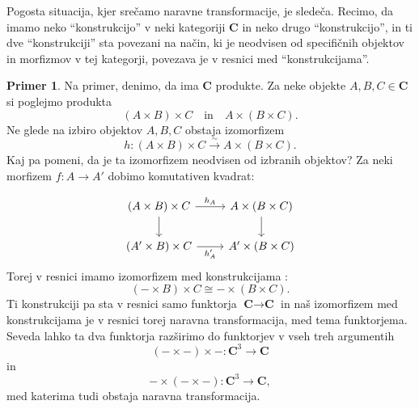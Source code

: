 \documentclass[12pt,a4paper]{book}
\theoremstyle{definition}
\theoremstyle{plain}
\theoremstyle{definition}
\newtheorem{primer}{Primer}[section]
\theoremstyle{remark}
\newcommand{\cat}[1]{\textbf{#1}}
\begin{document}
Pogosta situacija, kjer srečamo naravne transformacije, je sledeča. Recimo, da imamo neko "`konstrukcijo"' v neki kategoriji $\cat{C}$ in neko drugo "`konstrukcijo"', in ti dve "`konstrukciji"' sta povezani na način, ki je neodvisen od specifičnih objektov in morfizmov v tej kategorji, povezava je v resnici med "`konstrukcijama"'. 
\begin{primer}
Na primer, denimo, da ima $\cat{C}$ produkte. Za neke objekte $A,B,C \in \cat{C}$ si poglejmo produkta
$$(A \times B) \times C \quad \text{in} \quad A \times (B \times C).$$
Ne glede na izbiro objektov $A,B,C$ obstaja izomorfizem
$$h : (A \times B) \times C \xrightarrow{\sim} A \times (B \times C).$$
Kaj pa pomeni, da je ta izomorfizem neodvisen od izbranih objektov? Za neki morfizem $f : A \to A'$ dobimo komutativen kvadrat:

$$ \begin{tikzcd}
(A \times B) \times C \ar[r, "h_A"] \ar[d] & A \times (B \times C) \ar[d] \\
(A' \times B) \times C \ar[r, "h_A'"'] & A' \times (B \times C) 
\end{tikzcd} $$
Torej v resnici imamo izomorfizem med konstrukcijama :
$$(- \times B) \times C \cong - \times (B \times C).$$
Ti konstrukciji pa sta v resnici samo funktorja $\cat{C} \to \cat{C}$ in naš izomorfizem med konstrukcijama je v resnici torej naravna transformacija, med tema funktorjema. Seveda lahko ta dva funktorja razširimo do funktorjev v vseh treh argumentih
$$(- \times -) \times - : \cat{C}^3 \to \cat{C}$$
in
$$ - \times (- \times -) : \cat{C}^3 \to \cat{C},$$
med katerima tudi obstaja naravna transformacija.
\end{primer}
\end{document}
